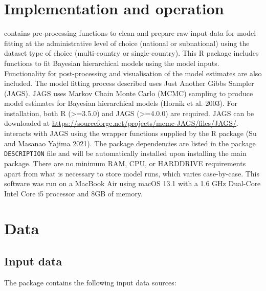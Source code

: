 \hypertarget{implementation-and-operation}{%
\section{Implementation and operation}\label{implementation-and-operation}}

 contains pre-processing functions to clean and prepare raw input data for model fitting at the administrative level of choice (national or subnational) using the dataset type of choice (multi-country or single-country). This R package includes functions to fit Bayesian hierarchical models using the model inputs. Functionality for post-processing and visualisation of the model estimates are also included. The model fitting process described uses Just Another Gibbs Sampler (JAGS). JAGS uses Markov Chain Monte Carlo (MCMC) sampling to produce model estimates for Bayesian hierarchical models (Hornik et al. 2003). For installation, both R (\textgreater=3.5.0) and JAGS (\textgreater=4.0.0) are required. JAGS can be downloaded at \url{https://sourceforge.net/projects/mcmc-JAGS/files/JAGS/}.  interacts with JAGS using the wrapper functions supplied by the R package  (Su and Masanao Yajima 2021). The  package dependencies are listed in the package \texttt{DESCRIPTION} file and will be automatically installed upon installing the main package. There are no minimum RAM, CPU, or HARDDRIVE requirements apart from what is necessary to store model runs, which varies case-by-case. This software was run on a MacBook Air using macOS 13.1 with a 1.6 GHz Dual-Core Intel Core i5 processor and 8GB of memory.

\hypertarget{data}{%
\section{Data}\label{data}}

\hypertarget{input-data}{%
\subsection{Input data}\label{input-data}}

The  package contains the following input data sources:

